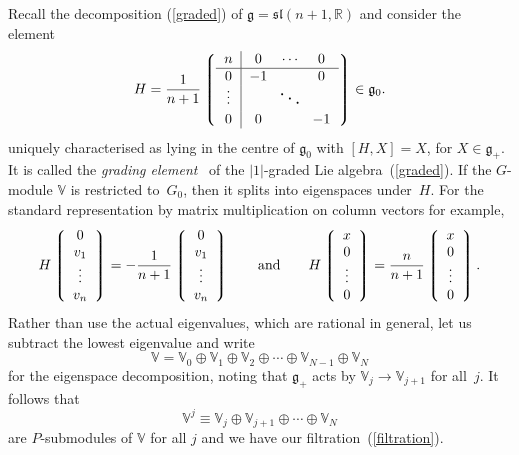Recall the decomposition (\ref{graded}) of
${\mathfrak{g}}={\mathfrak{sl}}(n+1,{\mathbb{R}})$ and consider the element
\[H=\frac{1}{n+1}
\left\lgroup\begin{tabular}{c|ccc}$n$&$0$&$\!\cdots\!$&$0$\\ \hline
$0$&$-1$&&$0$\\
\raisebox{2pt}[15pt]{$\vdots$}&&
\raisebox{1pt}[0pt][0pt]{\makebox[0pt]{\Large$\ddots$}}\\
$0$&$0$&&$-1$\end{tabular}\right\rgroup\in{\mathfrak{g}}_0.\]
uniquely characterised as lying in the centre of ${\mathfrak{g}}_0$ with
$[H,X]=X$, for $X\in{\mathfrak{g}}_+$. It is called the {\em grading
element\/}~\cite{thebook} of the $|1|$-graded Lie algebra~(\ref{graded}). If
the $G$-module ${\mathbb{V}}$ is restricted to~$G_0$, then it splits into
eigenspaces under~$H$. For the standard representation by matrix multiplication
on column vectors for example,
\begin{equation}\label{Hstandard}
H\left\lgroup\begin{array}{c}0\\ v_1\\ \vdots\\ v_n\end{array}\right\rgroup=
-\frac{1}{n+1}
\left\lgroup\begin{array}{c}0\\ v_1\\ \vdots\\ v_n\end{array}\right\rgroup
\qquad\mbox{and}\qquad
H\left\lgroup\begin{array}{c}x\\ 0\\ \vdots\\ 0\end{array}\right\rgroup=
\frac{n}{n+1}
\left\lgroup\begin{array}{c}x\\ 0\\ \vdots\\ 0\end{array}\right\rgroup.
\end{equation}
Rather than use the actual eigenvalues, which are rational in general, let us
subtract the lowest eigenvalue and write
\begin{equation}\label{splits}
{\mathbb{V}}={\mathbb{V}}_0\oplus{\mathbb{V}}_1\oplus{\mathbb{V}}_2
\oplus\cdots\oplus{\mathbb{V}}_{N-1}\oplus{\mathbb{V}}_N\end{equation}
for the eigenspace decomposition, noting that ${\mathfrak{g}}_+$ acts by
${\mathbb{V}}_j\to{\mathbb{V}}_{j+1}$ for all~$j$. It follows that
\begin{equation}\label{submodules}
{\mathbb{V}}^j\equiv{\mathbb{V}}_j\oplus{\mathbb{V}}_{j+1}\oplus\cdots\oplus
{\mathbb{V}}_N\end{equation}
are $P$-submodules of ${\mathbb{V}}$ for all $j$ and we have our
f\/iltration~(\ref{filtration}).

